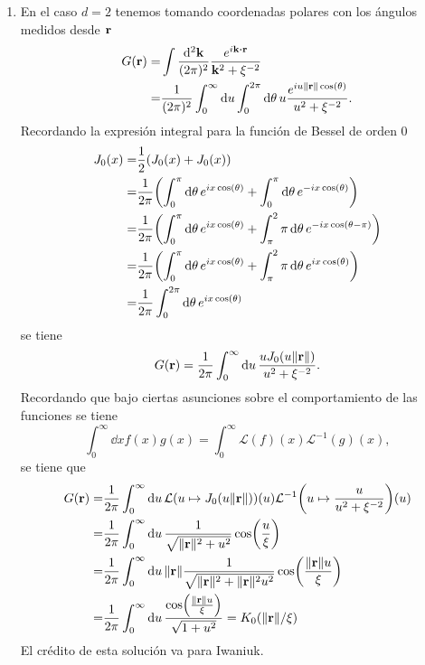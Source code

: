 \documentclass{article}
\begin{document}
\begin{enumerate}
\item En el caso $d=2$ tenemos tomando coordenadas polares con los ángulos medidos desde $\vb{r}$
\begin{align}
\begin{split}
G(\vb{r})=&\int\frac{\dd[2]{\vb{k}}}{(2\pi)^2}\frac{e^{i\vb{k}\vdot\vb{r}}}{\vb{k}^2+\xi^{-2}}\\
=&\frac{1}{(2\pi)^2}\int_0^\infty\dd{u}\int_0^{2\pi}\dd{\theta}u\frac{e^{iu\|\vb{r}\|\cos(\theta)}}{u^2+\xi^{-2}}.
\end{split}
\end{align}
Recordando la expresión integral para la función de Bessel de orden $0$\cite{NIST_DLMF_10.32}
\begin{align}
\begin{split}
J_0(x)=&\frac{1}{2}(J_0(x)+J_0(x))\\
=&\frac{1}{2\pi}\qty(\int_0^\pi \dd{\theta}e^{ix\cos(\theta)}+\int_0^\pi \dd{\theta}e^{-ix\cos(\theta)})\\
=&\frac{1}{2\pi}\qty(\int_0^\pi \dd{\theta}e^{ix\cos(\theta)}+\int_\pi^2\pi \dd{\theta}e^{-ix\cos(\theta-\pi)})\\
=&\frac{1}{2\pi}\qty(\int_0^\pi \dd{\theta}e^{ix\cos(\theta)}+\int_\pi^2\pi \dd{\theta}e^{ix\cos(\theta)})\\
=&\frac{1}{2\pi}\int_0^{2\pi} \dd{\theta}e^{ix\cos(\theta)}
\end{split}
\end{align}
se tiene
\begin{equation}
G(\vb{r})=\frac{1}{2\pi}\int_0^\infty\dd{u}\frac{uJ_0(u\|\vb{r}\|)}{u^2+\xi^{-2}}.
\end{equation}
Recordando que bajo ciertas asunciones sobre el comportamiento de las funciones se tiene\cite{Williams1973}
\begin{equation}
\int_0^\infty \dd{x}f(x)g(x)=\int_0^\infty \mathcal{L}(f)(x)\mathcal{L}^{-1}(g)(x),
\end{equation}
se tiene que\cite{NIST_DLMF_10.32, Williams1973}
\begin{align}
\begin{split}
G(\vb{r})=&\frac{1}{2\pi}\int_0^\infty\dd{u}\mathcal{L}(u\mapsto J_0(u\|\vb{r}\|))(u)\mathcal{L}^{-1}\qty(u\mapsto\frac{u}{u^2+\xi^{-2}})(u)\\
=&\frac{1}{2\pi}\int_0^\infty\dd{u}\frac{1}{\sqrt{\|\vb{r}\|^2+u^2}}\cos(\frac{u}{\xi})\\
=&\frac{1}{2\pi}\int_0^\infty\dd{u}\|\vb{r}\|\frac{1}{\sqrt{\|\vb{r}\|^2+\|\vb{r}\|^2u^2}}\cos(\frac{\|\vb{r}\|u}{\xi})\\
=&\frac{1}{2\pi}\int_0^\infty\dd{u}\frac{\cos(\frac{\|\vb{r}\|u}{\xi})}{\sqrt{1+u^2}}=K_0(\|\vb{r}\|/\xi)
\end{split}
\end{align}
El crédito de esta solución va para Iwaniuk\cite{Iwaniuk2018}.


\end{enumerate}
\end{document}
